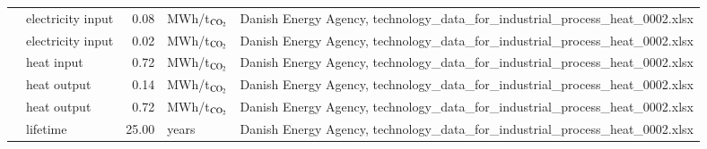 \begin{longtable}{p{4cm}p{4cm}rp{3cm}p{10cm}}
                      & electricity input &         0.08 &            MWh/t$_{\ce{CO2}}$ &                                                                                                                                                                                                                                                    Danish Energy Agency, technology\_data\_for\_industrial\_process\_heat\_0002.xlsx \\
                      & electricity input &         0.02 &            MWh/t$_{\ce{CO2}}$ &                                                                                                                                                                                                                                                    Danish Energy Agency, technology\_data\_for\_industrial\_process\_heat\_0002.xlsx \\
                      & heat input &         0.72 &            MWh/t$_{\ce{CO2}}$ &                                                                                                                                                                                                                                                    Danish Energy Agency, technology\_data\_for\_industrial\_process\_heat\_0002.xlsx \\
                      & heat output &         0.14 &            MWh/t$_{\ce{CO2}}$ &                                                                                                                                                                                                                                                    Danish Energy Agency, technology\_data\_for\_industrial\_process\_heat\_0002.xlsx \\
                      & heat output &         0.72 &            MWh/t$_{\ce{CO2}}$ &                                                                                                                                                                                                                                                    Danish Energy Agency, technology\_data\_for\_industrial\_process\_heat\_0002.xlsx \\
                      & lifetime &        25.00 &                         years &                                                                                                                                                                                                                                                    Danish Energy Agency, technology\_data\_for\_industrial\_process\_heat\_0002.xlsx \\

\end{longtable}
